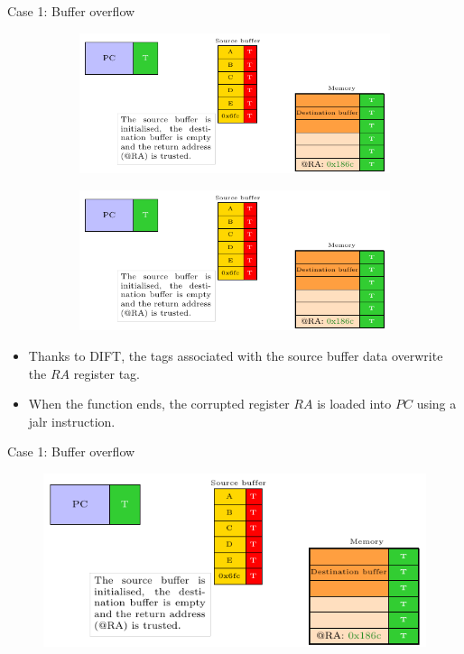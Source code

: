 \begin{frame}{Case 1: Buffer overflow}
    \begin{figure}
        \centering
        \begin{subfigure}[l]{.45\textwidth}
            \centering
            \includegraphics[width=.9\textwidth, page=3]{src/2_vuln_assessment/img/buffer_overflow/schemaPedagogique.pdf}
            \caption{}
            \label{fig:bo_3_step}
        \end{subfigure}
        \begin{subfigure}[r]{.45\textwidth}
            \centering
            \includegraphics[width=.9\textwidth, page=4]{src/2_vuln_assessment/img/buffer_overflow/schemaPedagogique.pdf}
            \caption{}
            \label{fig:bo_4_step}
        \end{subfigure}
    \end{figure}

    \begin{itemize}
        \item Thanks to DIFT, the tags associated with the source buffer data overwrite the $RA$ register tag.
        \item When the function ends, the corrupted register $RA$ is loaded into $PC$ using a jalr instruction.
    \end{itemize}
\end{frame}

\begin{frame}{Case 1: Buffer overflow}
    \begin{figure}
        \centering
        \includegraphics[width=.5\textwidth, page=5]{src/2_vuln_assessment/img/buffer_overflow/schemaPedagogique.pdf}
        \caption{}
        \label{fig:bo_5th_step}
    \end{figure}
\end{frame}


